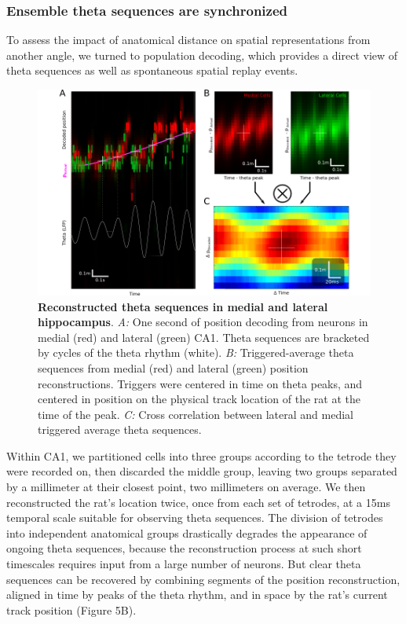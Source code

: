 \documentclass[]{article}
\begin{document}
\subsubsection{Ensemble theta sequences are synchronized}

To assess the impact of anatomical distance on spatial representations
from another angle, we turned to population decoding, which provides a
direct view of theta sequences as well as spontaneous spatial replay
events.

\begin{figure}[htbp]
\centering
\includegraphics{./finalFigs/sequences.png}
\caption{\textbf{Reconstructed theta sequences in medial and lateral hippocampus}.
\emph{A:} One second of position decoding from neurons in medial (red)
and lateral (green) CA1. Theta sequences are bracketed by cycles of the
theta rhythm (white). \emph{B:} Triggered-average theta sequences from
medial (red) and lateral (green) position reconstructions. Triggers were
centered in time on theta peaks, and centered in position on the
physical track location of the rat at the time of the peak. \emph{C:}
Cross correlation between lateral and medial triggered average theta
sequences.}
\end{figure}

Within CA1, we partitioned cells into three groups according to the
tetrode they were recorded on, then discarded the middle group, leaving
two groups separated by a millimeter at their closest point, two
millimeters on average. We then reconstructed the rat's location twice,
once from each set of tetrodes, at a 15ms temporal scale suitable for
observing theta sequences. The division of tetrodes into independent
anatomical groups drastically degrades the appearance of ongoing theta
sequences, because the reconstruction process at such short timescales
requires input from a large number of neurons. But clear theta sequences
can be recovered by combining segments of the position reconstruction,
aligned in time by peaks of the theta rhythm, and in space by the rat's
current track position (Figure 5B).
\end{document}
